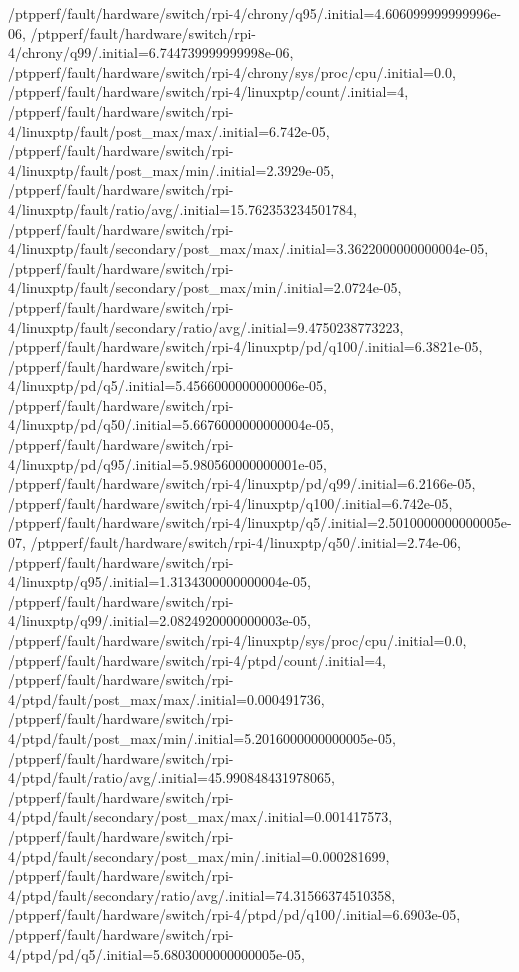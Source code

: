 {    /ptpperf/fault/hardware/switch/rpi-4/chrony/q95/.initial=4.606099999999996e-06,
    /ptpperf/fault/hardware/switch/rpi-4/chrony/q99/.initial=6.744739999999998e-06,
    /ptpperf/fault/hardware/switch/rpi-4/chrony/sys/proc/cpu/.initial=0.0,
    /ptpperf/fault/hardware/switch/rpi-4/linuxptp/count/.initial=4,
    /ptpperf/fault/hardware/switch/rpi-4/linuxptp/fault/post_max/max/.initial=6.742e-05,
    /ptpperf/fault/hardware/switch/rpi-4/linuxptp/fault/post_max/min/.initial=2.3929e-05,
    /ptpperf/fault/hardware/switch/rpi-4/linuxptp/fault/ratio/avg/.initial=15.762353234501784,
    /ptpperf/fault/hardware/switch/rpi-4/linuxptp/fault/secondary/post_max/max/.initial=3.3622000000000004e-05,
    /ptpperf/fault/hardware/switch/rpi-4/linuxptp/fault/secondary/post_max/min/.initial=2.0724e-05,
    /ptpperf/fault/hardware/switch/rpi-4/linuxptp/fault/secondary/ratio/avg/.initial=9.4750238773223,
    /ptpperf/fault/hardware/switch/rpi-4/linuxptp/pd/q100/.initial=6.3821e-05,
    /ptpperf/fault/hardware/switch/rpi-4/linuxptp/pd/q5/.initial=5.4566000000000006e-05,
    /ptpperf/fault/hardware/switch/rpi-4/linuxptp/pd/q50/.initial=5.6676000000000004e-05,
    /ptpperf/fault/hardware/switch/rpi-4/linuxptp/pd/q95/.initial=5.980560000000001e-05,
    /ptpperf/fault/hardware/switch/rpi-4/linuxptp/pd/q99/.initial=6.2166e-05,
    /ptpperf/fault/hardware/switch/rpi-4/linuxptp/q100/.initial=6.742e-05,
    /ptpperf/fault/hardware/switch/rpi-4/linuxptp/q5/.initial=2.5010000000000005e-07,
    /ptpperf/fault/hardware/switch/rpi-4/linuxptp/q50/.initial=2.74e-06,
    /ptpperf/fault/hardware/switch/rpi-4/linuxptp/q95/.initial=1.3134300000000004e-05,
    /ptpperf/fault/hardware/switch/rpi-4/linuxptp/q99/.initial=2.0824920000000003e-05,
    /ptpperf/fault/hardware/switch/rpi-4/linuxptp/sys/proc/cpu/.initial=0.0,
    /ptpperf/fault/hardware/switch/rpi-4/ptpd/count/.initial=4,
    /ptpperf/fault/hardware/switch/rpi-4/ptpd/fault/post_max/max/.initial=0.000491736,
    /ptpperf/fault/hardware/switch/rpi-4/ptpd/fault/post_max/min/.initial=5.2016000000000005e-05,
    /ptpperf/fault/hardware/switch/rpi-4/ptpd/fault/ratio/avg/.initial=45.990848431978065,
    /ptpperf/fault/hardware/switch/rpi-4/ptpd/fault/secondary/post_max/max/.initial=0.001417573,
    /ptpperf/fault/hardware/switch/rpi-4/ptpd/fault/secondary/post_max/min/.initial=0.000281699,
    /ptpperf/fault/hardware/switch/rpi-4/ptpd/fault/secondary/ratio/avg/.initial=74.31566374510358,
    /ptpperf/fault/hardware/switch/rpi-4/ptpd/pd/q100/.initial=6.6903e-05,
    /ptpperf/fault/hardware/switch/rpi-4/ptpd/pd/q5/.initial=5.6803000000000005e-05,
}
